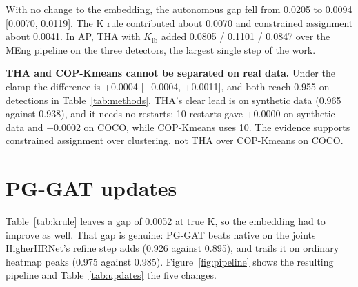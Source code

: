 \documentclass[11pt,a4paper]{article}
\newcommand{\Klb}{K_{\mathrm{lb}}}
\begin{document}
With no change to the embedding, the autonomous gap fell from 0.0205 to 0.0094 [0.0070, 0.0119].
The K rule contributed about 0.0070 and constrained assignment about 0.0041.
In AP, THA with $\Klb$ added 0.0805 / 0.1101 / 0.0847 over the MEng pipeline on the three detectors,
the largest single step of the work.

\textbf{THA and COP-Kmeans cannot be separated on real data.}
Under the clamp the difference is +0.0004 [$-$0.0004, +0.0011], and both reach 0.955 on detections in
Table~\ref{tab:methods}.
THA's clear lead is on synthetic data (0.965 against 0.938), and it needs no restarts:
10 restarts gave +0.0000 on synthetic data and $-$0.0002 on COCO, while COP-Kmeans uses 10.
The evidence supports constrained assignment over clustering, not THA over COP-Kmeans on COCO.

\section{PG-GAT updates}
\label{sec_pggat}

Table~\ref{tab:krule} leaves a gap of 0.0052 at true K, so the embedding had to improve as well.
That gap is genuine: PG-GAT beats native on the joints HigherHRNet's refine step adds (0.926 against 0.895),
and trails it on ordinary heatmap peaks (0.975 against 0.985).
Figure~\ref{fig:pipeline} shows the resulting pipeline and Table~\ref{tab:updates} the five changes.
\end{document}
